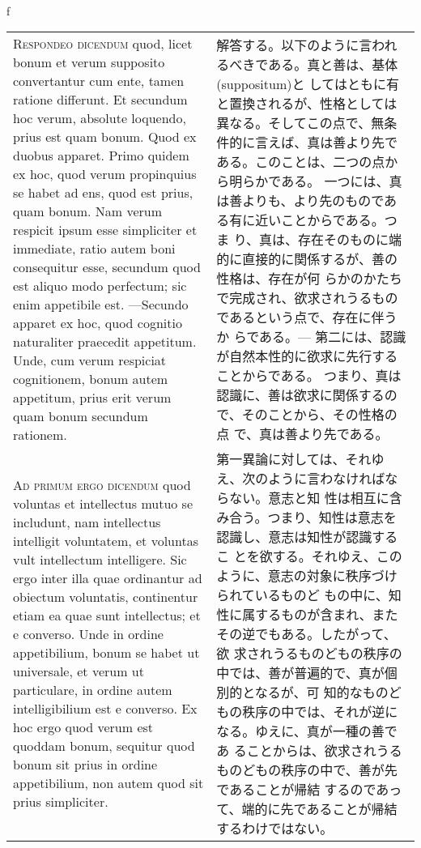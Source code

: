 \\f\documentclass[10pt]{jsarticle} %
\begin{document}
\begin{longtable}{p{21em}p{21em}}
\\

{\scshape Respondeo dicendum} quod, licet bonum et verum supposito
convertantur cum ente, tamen ratione differunt. Et secundum hoc verum,
absolute loquendo, prius est quam bonum. Quod ex duobus apparet.
Primo quidem ex hoc, quod verum propinquius se habet ad ens, quod est
prius, quam bonum. Nam verum respicit ipsum esse simpliciter et
immediate, ratio autem boni consequitur esse, secundum quod est aliquo
modo perfectum; sic enim appetibile est.  ---Secundo apparet ex hoc,
quod cognitio naturaliter praecedit appetitum. Unde, cum verum
respiciat cognitionem, bonum autem appetitum, prius erit verum quam
bonum secundum rationem.

&

解答する。以下のように言われるべきである。真と善は、基体(suppositum)と
してはともに有と置換されるが、性格としては異なる。そしてこの点で、無条
件的に言えば、真は善より先である。このことは、二つの点から明らかである。
一つには、真は善よりも、より先のものである有に近いことからである。つま
り、真は、存在そのものに端的に直接的に関係するが、善の性格は、存在が何
らかのかたちで完成され、欲求されうるものであるという点で、存在に伴うか
らである。--- 第二には、認識が自然本性的に欲求に先行することからである。
つまり、真は認識に、善は欲求に関係するので、そのことから、その性格の点
で、真は善より先である。

\\

{\scshape Ad primum ergo dicendum} quod voluntas et intellectus mutuo
se includunt, nam intellectus intelligit voluntatem, et voluntas vult
intellectum intelligere. Sic ergo inter illa quae ordinantur ad
obiectum voluntatis, continentur etiam ea quae sunt intellectus; et e
converso. Unde in ordine appetibilium, bonum se habet ut universale,
et verum ut particulare, in ordine autem intelligibilium est e
converso. Ex hoc ergo quod verum est quoddam bonum, sequitur quod
bonum sit prius in ordine appetibilium, non autem quod sit prius
simpliciter.

&

第一異論に対しては、それゆえ、次のように言わなければならない。意志と知
性は相互に含み合う。つまり、知性は意志を認識し、意志は知性が認識するこ
とを欲する。それゆえ、このように、意志の対象に秩序づけられているものど
もの中に、知性に属するものが含まれ、またその逆でもある。したがって、欲
求されうるものどもの秩序の中では、善が普遍的で、真が個別的となるが、可
知的なものどもの秩序の中では、それが逆になる。ゆえに、真が一種の善であ
ることからは、欲求されうるものどもの秩序の中で、善が先であることが帰結
するのであって、端的に先であることが帰結するわけではない。


\end{longtable}
\end{document}
